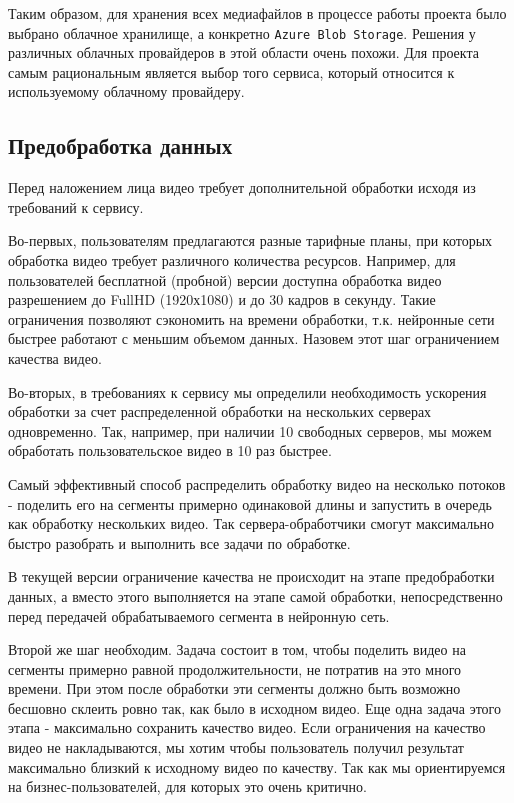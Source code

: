 Таким образом, для хранения всех медиафайлов в процессе работы проекта было выбрано облачное хранилище, а конкретно \texttt{Azure Blob Storage}. Решения у различных облачных провайдеров в этой области очень похожи. Для проекта самым рациональным является выбор того сервиса, который относится к используемому облачному провайдеру.

\subsection{Предобработка данных}

Перед наложением лица видео требует дополнительной обработки исходя из требований к сервису.

Во-первых, пользователям предлагаются разные тарифные планы, при которых обработка видео требует различного количества ресурсов. Например, для пользователей бесплатной (пробной) версии доступна обработка видео разрешением до FullHD (1920х1080) и до 30 кадров в секунду. Такие ограничения позволяют сэкономить на времени обработки, т.к. нейронные сети быстрее работают с меньшим объемом данных. Назовем этот шаг ограничением качества видео.

Во-вторых, в требованиях к сервису мы определили необходимость ускорения обработки за счет распределенной обработки на нескольких серверах одновременно. Так, например, при наличии 10 свободных серверов, мы можем обработать пользовательское видео в 10 раз быстрее.

Самый эффективный способ распределить обработку видео на несколько потоков - поделить его на сегменты примерно одинаковой длины и запустить в очередь как обработку нескольких видео. Так сервера-обработчики смогут максимально быстро разобрать и выполнить все задачи по обработке.

В текущей версии ограничение качества не происходит на этапе предобработки данных, а вместо этого выполняется на этапе самой обработки, непосредственно перед передачей обрабатываемого сегмента в нейронную сеть.

Второй же шаг необходим. Задача состоит в том, чтобы поделить видео на сегменты примерно равной продолжительности, не потратив на это много времени. При этом после обработки эти сегменты должно быть возможно бесшовно склеить ровно так, как было в исходном видео. Еще одна задача этого этапа - максимально сохранить качество видео. Если ограничения на качество видео не накладываются, мы хотим чтобы пользователь получил результат максимально близкий к исходному видео по качеству. Так как мы ориентируемся на бизнес-пользователей, для которых это очень критично.

